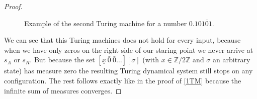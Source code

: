 \documentclass[12pt,a4paper]{scrartcl}
\theoremstyle{plain}
\theoremstyle{definition}
\numberwithin{equation}{section}
\newcommand{\2}{\mathbb{Z} / 2 \mathbb{Z}}
\newcommand{\1}{\bar{1}}
\newcommand{\0}{\bar{0}}
\begin{document}
\begin{proof}
\begin{figure}[]
		\caption{Example of the second Turing machine for a number $0.10 \overline{101}$.}
		\label{Graphik_zweite_TM}
	\end{figure}
	
	We can see that this Turing machines does not hold for every input, because when we have only zeros on the right side of our staring point we never arrive at $s_A$ or $s_R$. But because the set $[\underline{x} \ \0 \ \0 \ldots][\sigma]$ (with $x \in \2$ and $\sigma$ an arbitrary state) has measure zero the resulting Turing dynamical system still stops on any configuration. The rest follows exactly like in the proof of \ref{1TM} because the infinite sum of measures converges.
\end{proof}
\end{document}

